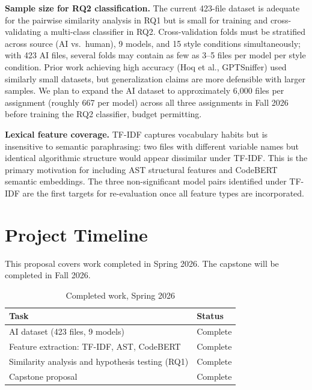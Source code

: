 \documentclass[sigconf]{acmart}
\begin{document}
\textbf{Sample size for RQ2 classification.} The current 423-file dataset is adequate for the pairwise similarity analysis in RQ1 but is small for training and cross-validating a multi-class classifier in RQ2. Cross-validation folds must be stratified across source (AI vs.\ human), 9 models, and 15 style conditions simultaneously; with 423 AI files, several folds may contain as few as 3--5 files per model per style condition. Prior work achieving high accuracy (Hoq et al., GPTSniffer) used similarly small datasets, but generalization claims are more defensible with larger samples. We plan to expand the AI dataset to approximately 6,000 files per assignment (roughly 667 per model) across all three assignments in Fall 2026 before training the RQ2 classifier, budget permitting.

\textbf{Lexical feature coverage.} TF-IDF captures vocabulary habits but is insensitive to semantic paraphrasing: two files with different variable names but identical algorithmic structure would appear dissimilar under TF-IDF. This is the primary motivation for including AST structural features and CodeBERT semantic embeddings. The three non-significant model pairs identified under TF-IDF are the first targets for re-evaluation once all feature types are incorporated.

\section{Project Timeline}

This proposal covers work completed in Spring 2026. The capstone will be completed in Fall 2026.

\begin{table}[h]
\caption{Completed work, Spring 2026}
\label{tab:timeline}
\begin{tabular}{ll}
\toprule
Task & Status \\
\midrule
AI dataset (423 files, 9 models) & Complete \\
Feature extraction: TF-IDF, AST, CodeBERT & Complete \\
Similarity analysis and hypothesis testing (RQ1) & Complete \\
Capstone proposal & Complete \\
\bottomrule
\end{tabular}
\end{table}
\end{document}
